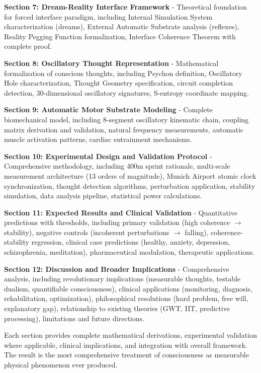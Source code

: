 \documentclass[11pt,onecolumn]{article}
\begin{document}
\textbf{Section 7: Dream-Reality Interface Framework} - Theoretical foundation for forced interface paradigm, including Internal Simulation System characterization (dreams), External Automatic Substrate analysis (reflexes), Reality Pegging Function formalization, Interface Coherence Theorem with complete proof.

\textbf{Section 8: Oscillatory Thought Representation} - Mathematical formalization of conscious thoughts, including Psychon definition, Oscillatory Hole characterization, Thought Geometry specification, circuit completion detection, 30-dimensional oscillatory signatures, S-entropy coordinate mapping.

\textbf{Section 9: Automatic Motor Substrate Modeling} - Complete biomechanical model, including 8-segment oscillatory kinematic chain, coupling matrix derivation and validation, natural frequency measurements, automatic muscle activation patterns, cardiac entrainment mechanisms.

\textbf{Section 10: Experimental Design and Validation Protocol} - Comprehensive methodology, including 400m sprint rationale, multi-scale measurement architecture (13 orders of magnitude), Munich Airport atomic clock synchronization, thought detection algorithms, perturbation application, stability simulation, data analysis pipeline, statistical power calculations.

\textbf{Section 11: Expected Results and Clinical Validation} - Quantitative predictions with thresholds, including primary validation (high coherence $\to$ stability), negative controls (incoherent perturbations $\to$ falling), coherence-stability regression, clinical case predictions (healthy, anxiety, depression, schizophrenia, meditation), pharmaceutical modulation, therapeutic applications.

\textbf{Section 12: Discussion and Broader Implications} - Comprehensive analysis, including revolutionary implications (measurable thoughts, testable dualism, quantifiable consciousness), clinical applications (monitoring, diagnosis, rehabilitation, optimization), philosophical resolutions (hard problem, free will, explanatory gap), relationship to existing theories (GWT, IIT, predictive processing), limitations and future directions.

Each section provides complete mathematical derivations, experimental validation where applicable, clinical implications, and integration with overall framework. The result is the most comprehensive treatment of consciousness as measurable physical phenomenon ever produced.
\end{document}
